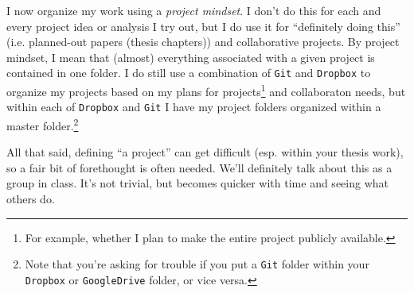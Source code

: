 \documentclass[12pt,letterpaper]{article}
\begin{document}
I now organize my work using a \emph{project mindset}.  I don't do this for each and every project idea or analysis I try out, but I do use it for ``definitely doing this'' (i.e.  planned-out papers (thesis chapters)) and collaborative projects.
By project mindset, I mean that (almost) everything associated with a given project is contained in one folder.
I do still use a combination of \texttt{Git} and \texttt{Dropbox} to organize my projects based on my plans for projects\footnote{For example, whether I plan to make the entire project publicly available.} and collaboraton needs, but within each of \texttt{Dropbox} and \texttt{Git} I have my project folders organized within a master folder.\footnote{Note that you're asking for trouble if you put a \texttt{Git} folder within your \texttt{Dropbox} or \texttt{GoogleDrive} folder, or vice versa.}

All that said, defining ``a project'' can get difficult (esp. within your thesis work), so a fair bit of forethought is often needed.
We'll definitely talk about this as a group in class.
It's not trivial, but becomes quicker with time and seeing what others do.
\end{document}
